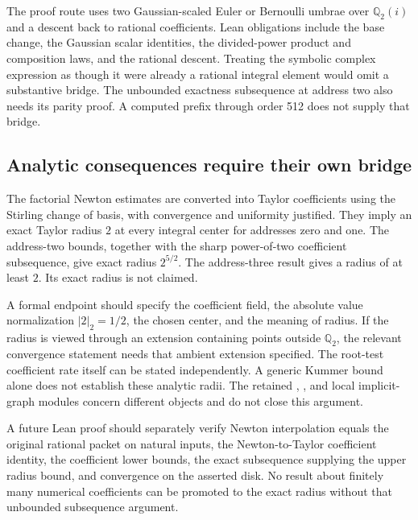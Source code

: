 The proof route uses two Gaussian-scaled Euler or Bernoulli umbrae over $\mathbb Q_2(i)$ and a descent back to rational coefficients. Lean obligations include the base change, the Gaussian scalar identities, the divided-power product and composition laws, and the rational descent. Treating the symbolic complex expression as though it were already a rational integral element would omit a substantive bridge. The unbounded exactness subsequence at address two also needs its parity proof. A computed prefix through order 512 does not supply that bridge.

\subsection{Analytic consequences require their own bridge}
The factorial Newton estimates are converted into Taylor coefficients using the Stirling change of basis, with convergence and uniformity justified. They imply an exact Taylor radius $2$ at every integral center for addresses zero and one. The address-two bounds, together with the sharp power-of-two coefficient subsequence, give exact radius $2^{5/2}$. The address-three result gives a radius of at least $2$. Its exact radius is not claimed.

A formal endpoint should specify the coefficient field, the absolute value normalization $|2|_2=1/2$, the chosen center, and the meaning of radius. If the radius is viewed through an extension containing points outside $\mathbb Q_2$, the relevant convergence statement needs that ambient extension specified. The root-test coefficient rate itself can be stated independently. A generic Kummer bound alone does not establish these analytic radii. The retained , , and local implicit-graph modules concern different objects and do not close this argument.

A future Lean proof should separately verify Newton interpolation equals the original rational packet on natural inputs, the Newton-to-Taylor coefficient identity, the coefficient lower bounds, the exact subsequence supplying the upper radius bound, and convergence on the asserted disk. No result about finitely many numerical coefficients can be promoted to the exact radius without that unbounded subsequence argument.

